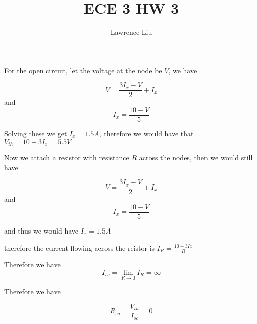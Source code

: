\documentclass[12pt]{article}
\title{ECE 3 HW 3}
\author{Lawrence Liu}
\begin{document}
\maketitle

For the open circuit, let the voltage at the node be $V$, we have

$$V=\frac{3I_x-V}{2}+I_x$$
and
$$I_x=\frac{10-V}{5}$$

Solving these we get $I_x=1.5A$, therefore we would have that $V_{th}=10-3I_x=\boxed{5.5V}$

Now we attach a resistor with resistance $R$ across the nodes, then we would still 
have

$$V=\frac{3I_x-V}{2}+I_x$$
and
$$I_x=\frac{10-V}{5}$$

and thus we would have $I_x=1.5A$

therefore the current flowing across the reistor is 
$I_R=\frac{10-3Ix}{R}$

Therefore we have
$$I_{sc}=\lim_{R\to0}I_R=\infty$$

Therefore we have

$$R_{eq}=\frac{V_{th}}{I_{sc}}=\boxed{0}$$
\end{document}
